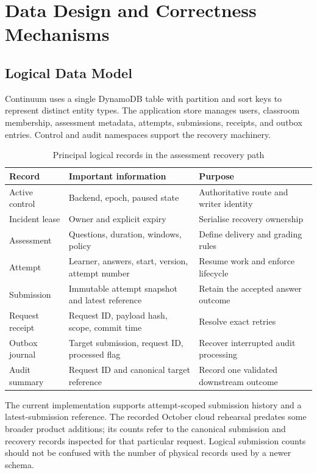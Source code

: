 \chapter{Data Design and Correctness Mechanisms}
\section{Logical Data Model}
Continuum uses a single DynamoDB table with partition and sort keys to represent distinct entity types. The application store manages users, classroom membership, assessment metadata, attempts, submissions, receipts, and outbox entries. Control and audit namespaces support the recovery machinery.


\begin{table}[htbp]\centering\small
\caption{Principal logical records in the assessment recovery path}\label{tab:records}
\begin{tabularx}{\textwidth}{@{}L{28mm}YY@{}}\toprule
\textbf{Record} & \textbf{Important information} & \textbf{Purpose}\\\midrule
Active control & Backend, epoch, paused state & Authoritative route and writer identity\\
Incident lease & Owner and explicit expiry & Serialise recovery ownership\\
Assessment & Questions, duration, windows, policy & Define delivery and grading rules\\
Attempt & Learner, answers, start, version, attempt number & Resume work and enforce lifecycle\\
Submission & Immutable attempt snapshot and latest reference & Retain the accepted answer outcome\\
Request receipt & Request ID, payload hash, scope, commit time & Resolve exact retries\\
Outbox journal & Target submission, request ID, processed flag & Recover interrupted audit processing\\
Audit summary & Request ID and canonical target reference & Record one validated downstream outcome\\\bottomrule
\end{tabularx}\end{table}

The current implementation supports attempt-scoped submission history and a latest-submission reference. The recorded October cloud rehearsal predates some broader product additions; its counts refer to the canonical submission and recovery records inspected for that particular request. Logical submission counts should not be confused with the number of physical records used by a newer schema.
